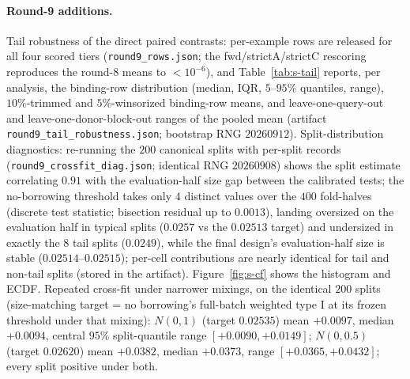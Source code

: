 \documentclass[11pt]{article}
\begin{document}
\paragraph{Round-9 additions.} Tail robustness of the
direct paired contrasts: per-example rows are released for all four
scored tiers (\texttt{round9\_rows.json}; the fwd/strictA/strictC
rescoring reproduces the round-8 means to $<10^{-6}$), and
Table~\ref{tab:s-tail} reports, per analysis, the binding-row
distribution (median, IQR, $5$--$95\%$ quantiles, range), $10\%$-trimmed
and $5\%$-winsorized binding-row means, and leave-one-query-out and
leave-one-donor-block-out ranges of the pooled mean (artifact
\texttt{round9\_\allowbreak tail\_robustness.json}; bootstrap RNG
$20260912$).
Split-distribution diagnostics: re-running the $200$ canonical splits
with per-split records (\texttt{round9\_crossfit\_diag.json}; identical
RNG $20260908$) shows the split estimate correlating $0.91$ with the
evaluation-half size gap between the calibrated tests; the no-borrowing
threshold takes only $4$ distinct values over the $400$ fold-halves
(discrete test statistic; bisection residual up to $0.0013$), landing
oversized on the evaluation half in typical splits ($0.0257$ vs the
$0.02513$ target) and undersized in exactly the $8$ tail splits
($0.0249$), while the final design's evaluation-half size is stable
($0.02514$--$0.02515$); per-cell contributions are nearly identical for
tail and non-tail splits (stored in the artifact). Figure~\ref{fig:s-cf}
shows the histogram and ECDF. Repeated cross-fit under narrower
mixings, on the identical $200$ splits (size-matching target = no
borrowing's full-batch weighted type I at its frozen threshold under
that mixing): $N(0,1)$ (target $0.02535$) mean $+0.0097$, median
$+0.0094$, central $95\%$ split-quantile range $[+0.0090,+0.0149]$;
$N(0,0.5)$ (target $0.02620$) mean $+0.0382$, median $+0.0373$, range
$[+0.0365,+0.0432]$; every split positive under both.
\end{document}
